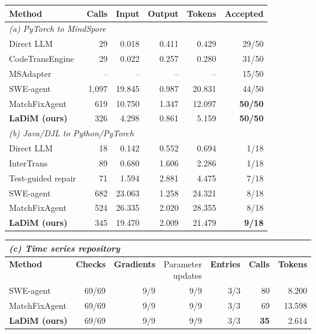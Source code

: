 \begin{tabular*}{\linewidth}{@{\extracolsep{\fill}}lrrrrr@{}}
\toprule
\textbf{Method} & \textbf{Calls} & \textbf{Input} & \textbf{Output} & \textbf{Tokens} & \textbf{Accepted} \\
\midrule
\multicolumn{6}{l}{\textit{(a) PyTorch to MindSpore}} \\
Direct LLM & 29 & 0.018 & 0.411 & 0.429 & 29/50 \\
CodeTransEngine~\citep{macedo2025codetransengine} & 29 & 0.022 & 0.257 & 0.280 & 31/50 \\
MSAdapter~\citep{openi2025msadapter} & -- & -- & -- & -- & 15/50 \\
SWE-agent~\citep{yang2024sweagent} & 1,097 & 19.845 & 0.987 & 20.831 & 44/50 \\
MatchFixAgent~\citep{ibrahimzada2025matchfixagent} & 619 & 10.750 & 1.347 & 12.097 & \textbf{50/50} \\
\textbf{LaDiM (ours)} & 326 & 4.298 & 0.861 & 5.159 & \textbf{50/50} \\
\midrule
\multicolumn{6}{l}{\textit{(b) Java/DJL to Python/PyTorch}} \\
Direct LLM & 18 & 0.142 & 0.552 & 0.694 & 1/18 \\
InterTrans~\citep{macedo2024intertrans} & 89 & 0.680 & 1.606 & 2.286 & 1/18 \\
Test-guided repair & 71 & 1.594 & 2.881 & 4.475 & 7/18 \\
SWE-agent & 682 & 23.063 & 1.258 & 24.321 & 8/18 \\
MatchFixAgent & 524 & 26.335 & 2.020 & 28.355 & 8/18 \\
\textbf{LaDiM (ours)} & 345 & 19.470 & 2.009 & 21.479 & \textbf{9/18} \\
\bottomrule
\end{tabular*}
\par\vspace{5pt}
\begin{tabular*}{\linewidth}{@{\extracolsep{\fill}}lrrrrrr@{}}
\toprule
\multicolumn{7}{l}{\textit{(c) Time series repository}} \\
\midrule
\textbf{Method} & \textbf{Checks} & \textbf{Gradients} & \thead{Parameter\\updates} & \textbf{Entries} & \textbf{Calls} & \textbf{Tokens} \\
\midrule
SWE-agent & 69/69 & 9/9 & 9/9 & 3/3 & 80 & 8.200 \\
MatchFixAgent & 69/69 & 9/9 & 9/9 & 3/3 & 69 & 13.598 \\
\textbf{LaDiM (ours)} & 69/69 & 9/9 & 9/9 & 3/3 & \textbf{35} & 2.614 \\
\bottomrule
\end{tabular*}
